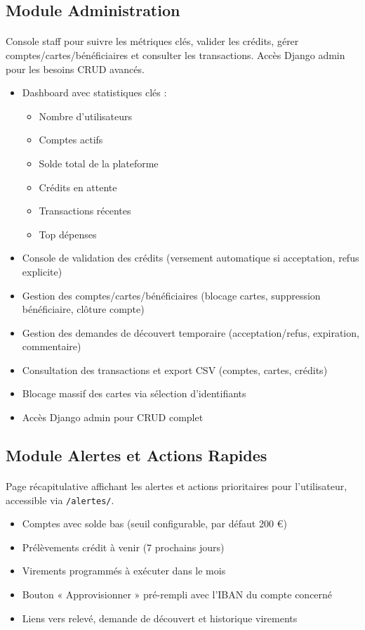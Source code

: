 \documentclass[12pt,a4paper]{report}
\begin{document}
\subsection{Module Administration}
\paragraph{}Console staff pour suivre les métriques clés, valider les crédits, gérer comptes/cartes/bénéficiaires et consulter les transactions. Accès Django admin pour les besoins CRUD avancés.
\begin{itemize}[leftmargin=1.5cm]
    \item Dashboard avec statistiques clés :
    \begin{itemize}
        \item Nombre d'utilisateurs
        \item Comptes actifs
        \item Solde total de la plateforme
        \item Crédits en attente
        \item Transactions récentes
        \item Top dépenses
    \end{itemize}
    \item Console de validation des crédits (versement automatique si acceptation, refus explicite)
    \item Gestion des comptes/cartes/bénéficiaires (blocage cartes, suppression bénéficiaire, clôture compte)
    \item Gestion des demandes de découvert temporaire (acceptation/refus, expiration, commentaire)
    \item Consultation des transactions et export CSV (comptes, cartes, crédits)
    \item Blocage massif des cartes via sélection d'identifiants
    \item Accès Django admin pour CRUD complet
\end{itemize}

\subsection{Module Alertes et Actions Rapides}
\paragraph{}Page récapitulative affichant les alertes et actions prioritaires pour l'utilisateur, accessible via \texttt{/alertes/}.
\begin{itemize}[leftmargin=1.5cm]
    \item Comptes avec solde bas (seuil configurable, par défaut 200 €)
    \item Prélèvements crédit à venir (7 prochains jours)
    \item Virements programmés à exécuter dans le mois
    \item Bouton « Approvisionner » pré-rempli avec l'IBAN du compte concerné
    \item Liens vers relevé, demande de découvert et historique virements
\end{itemize}
\end{document}
